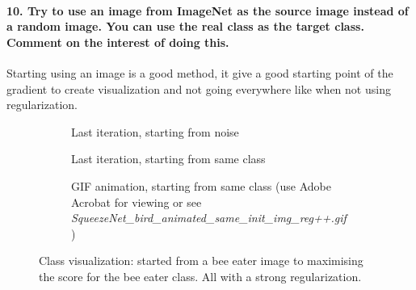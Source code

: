 \paragraph*{10. Try to use an image from ImageNet as the source image instead of a random image. You can use the real class as the target class. Comment on the interest of doing this.}

Starting using an image is a good method, it give a good starting point of the gradient to create visualization and not going everywhere like when not using regularization.
\begin{figure}[H]
    \centering
    \begin{subfigure}{.33\textwidth}
        \centering
        \caption{Last iteration, starting from noise}
        \label{fig:class_viz_start_image:png_noise}
    \end{subfigure}%
    \begin{subfigure}{.33\textwidth}
        \centering
        \caption{Last iteration, starting from same class}
        \label{fig:class_viz_start_image:png}
    \end{subfigure}%
    \begin{subfigure}{.33\textwidth}
        \centering
        \caption{GIF animation, starting from same class (use Adobe Acrobat for viewing or see \textit{SqueezeNet\_bird\_animated\_same\_init\_img\_reg++.gif})}
        \label{fig:class_viz_start_image:gif}
    \end{subfigure}

    \caption{Class visualization: started from a bee eater image to maximising the score for the bee eater class. All with a strong regularization.}
    \label{fig:class_viz_start_image}
\end{figure}


